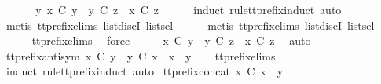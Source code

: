 \begin{isabellebody}
\ {\isacharminus}\isanewline
\ \ \isamarkupfalse%
\ {\isachardoublequoteopen}{\isasymexists}\ y{\isachardot}\ x\ {\isasymle}\isactrlsub C\ y\ {\isasymand}\ y\ {\isasymle}\isactrlsub C\ z\ {\isasymLongrightarrow}\ x\ {\isasymle}\isactrlsub C\ z{\isachardoublequoteclose}\isanewline
\ \ \ \ \isamarkupfalse%
\ {\isacharparenleft}induct\ rule{\isacharcolon}tt{\isacharunderscore}prefix{\isachardot}induct{\isacharcomma}\ auto{\isacharparenright}\isanewline
\ \ \ \ \isamarkupfalse%
\ {\isacharparenleft}metis\ tt{\isacharunderscore}prefix{\isachardot}elims{\isacharparenleft}{}{\isacharparenright}\ list{\isachardot}discI\ list{\isachardot}sel{\isacharparenleft}{}{\isacharparenright}{\isacharparenright}\isanewline
\ \ \ \ \isamarkupfalse%
\ {\isacharparenleft}metis\ tt{\isacharunderscore}prefix{\isachardot}elims{\isacharparenleft}{}{\isacharparenright}\ list{\isachardot}discI\ list{\isachardot}sel{\isacharparenleft}{}{\isacharparenright}{\isacharparenright}\isanewline
\ \ \ \ \isamarkupfalse%
\ tt{\isacharunderscore}prefix{\isachardot}elims{\isacharparenleft}{}{\isacharparenright}\ \isamarkupfalse%
\ force\isanewline
\ \ \isamarkupfalse%
\ \isamarkupfalse%
\ {\isachardoublequoteopen}x\ {\isasymle}\isactrlsub C\ y\ {\isasymLongrightarrow}\ y\ {\isasymle}\isactrlsub C\ z\ {\isasymLongrightarrow}\ x\ {\isasymle}\isactrlsub C\ z{\isachardoublequoteclose}\ \isamarkupfalse%
\ auto\isanewline
{}\isamarkupfalse%
%
\endisatagproof
{\isafoldproof}%
%
\isadelimproof
\isanewline
%
\endisadelimproof
\isanewline
{}\isamarkupfalse%
\ tt{\isacharunderscore}prefix{\isacharunderscore}antisym{\isacharcolon}\ {\isachardoublequoteopen}x\ {\isasymle}\isactrlsub C\ y\ {\isasymLongrightarrow}\ y\ {\isasymle}\isactrlsub C\ x\ {\isasymLongrightarrow}\ x\ {\isacharequal}\ y{\isachardoublequoteclose}\isanewline
%
\isadelimproof
\ \ %
\endisadelimproof
%
\isatagproof
{}\isamarkupfalse%
\ tt{\isacharunderscore}prefix{\isachardot}elims{\isacharparenleft}{}{\isacharparenright}\ \isamarkupfalse%
\ {\isacharparenleft}induct\ rule{\isacharcolon}tt{\isacharunderscore}prefix{\isachardot}induct{\isacharcomma}\ auto{\isacharparenright}%
\endisatagproof
{\isafoldproof}%
%
\isadelimproof
\isanewline
%
\endisadelimproof
\isanewline
{}\isamarkupfalse%
\ tt{\isacharunderscore}prefix{\isacharunderscore}concat{\isacharcolon}\ {\isachardoublequoteopen}x\ {\isasymle}\isactrlsub C\ x\ {\isacharat}\ y{\isachardoublequoteclose}\isanewline

\end{isabellebody}
